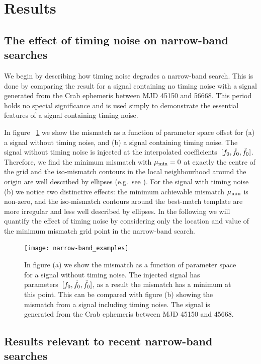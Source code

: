\documentclass[../full_thesis/full_thesis.tex]{subfiles}
\begin{document}
\section{Results}
\label{sec: narrow-band results}
\subsection{The effect of timing noise on narrow-band searches} We begin by
describing how timing noise degrades a narrow-band search. This is done by
comparing the result for a signal containing no timing noise with a signal
generated from the Crab ephemeris between MJD 45150 and 56668. This period
holds no special significance and is used simply to demonstrate the essential
features of a signal containing timing noise.

In figure ~\ref{fig: narrow-band example} we show the mismatch as a function of
parameter space offset for (a) a signal without timing noise, and (b) a signal
containing timing noise. The signal without timing noise is injected at the
interpolated coefficients~$[f_{0}, \dot{f}_{0}, \ddot{f}_{0}]$.  Therefore, we find
the minimum mismatch with $\mu_{\mathrm{min}}=0$ at exactly the centre of the grid and the
iso-mismatch contours in the local neighbourhood around the origin are well
described by ellipses (e.g.\ see \citet{Prix2007}).  For the signal with timing
noise (b) we notice two distinctive effects: the minimum achievable mismatch
$\mu_{\mathrm{min}}$ is non-zero, and the iso-mismatch contours around the best-match
template are more irregular and less well described by ellipses.  In the
following we will quantify the effect of timing noise by considering only the
location and value of the minimum mismatch grid point in the narrow-band
search.
\begin{figure}[htb]
\centering
\texttt{[image: narrow-band\_examples]}
\caption{In figure (a) we show the mismatch as a function of parameter space
    for a signal without timing noise. The injected signal has
    parameters~$[f_{0}, \dot{f}_{0}, \ddot{f}_{0}]$, as a result the mismatch has
    a minimum at this point. This can be compared with figure (b) showing the
mismatch from a signal including timing noise. The signal is generated from the
Crab ephemeris between MJD 45150 and 45668.}
\label{fig: narrow-band example}
\end{figure}


\subsection{Results relevant to recent narrow-band searches}
\end{document}
